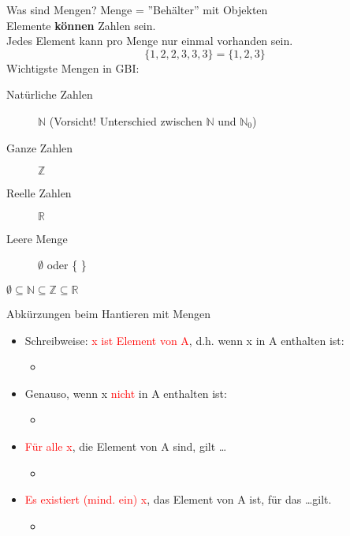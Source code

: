 \begin{frame}{Was sind Mengen?}
	Menge = ''Behälter'' mit Objekten\\
	Elemente \textbf{können} Zahlen sein.\\
	Jedes Element kann pro Menge nur einmal vorhanden sein.\\
	\begin{equation*}
		\lbrace 1, 2, 2, 3, 3, 3\rbrace = \lbrace 1, 2, 3\rbrace
	\end{equation*}
	Wichtigste Mengen in GBI:\\
	\begin{description}
		\item[Natürliche Zahlen] $\mathbb{N}$ (Vorsicht! Unterschied zwischen $\mathbb{N}$ und $\mathbb{N}_0$)
		\item[Ganze Zahlen] $\mathbb{Z}$
		\item[Reelle Zahlen] $\mathbb{R}$
		\item[Leere Menge] $\emptyset$ oder \{   \}
	\end{description}
	$\emptyset\subseteq\mathbb{N}\subseteq\mathbb{Z}\subseteq\mathbb{R}$
\end{frame}

\begin{frame}{Abkürzungen beim Hantieren mit Mengen}
	\begin{itemize}
		\item[] Schreibweise: \textcolor{red}{x ist Element von A}, d.h. wenn x in A enthalten ist:
		      \begin{itemize}
			      \item[] 
		      \end{itemize}
		\item[] Genauso, wenn x \textcolor{red}{nicht} in A enthalten ist:
		      \begin{itemize}
			      \item[] 
		      \end{itemize}
		\item[] \textcolor{red}{Für alle x}, die Element von A sind, gilt \dots
		      \begin{itemize}
			      \item[] 
		      \end{itemize}
		\item[] \textcolor{red}{Es existiert (mind. ein) x}, das Element von A ist, für das \dots gilt.
		      \begin{itemize}
			      \item[] 
		      \end{itemize}
	\end{itemize}
\end{frame}

